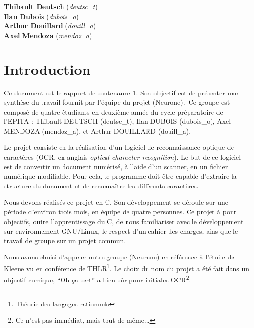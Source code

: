 \documentclass[11pt]{report}
\begin{document}
\begin{titlepage}

\Large
\textbf{Thibault Deutsch} (\emph{deutsc\_t}) \\
\textbf{Ilan Dubois} (\emph{dubois\_o}) \\
\textbf{Arthur Douillard} (\emph{douill\_a}) \\
\textbf{Axel Mendoza} (\emph{mendoz\_a})\\[2cm]

\vfill %

\end{titlepage}

\newpage
{}
\chapter{Introduction}

Ce document est le rapport de soutenance 1. Son objectif est de présenter une synthèse du travail fournit par l’équipe du projet (Neurone)\up{*}.\ Ce groupe est composé de quatre étudiants en deuxième année du cycle préparatoire de l’EPITA : Thibault DEUTSCH (deutsc\_t), Ilan DUBOIS (dubois\_o),  Axel MENDOZA (mendoz\_a), et Arthur DOUILLARD (douill\_a).

Le projet consiste en la réalisation d’un logiciel de reconnaissance optique de caractères (OCR, en anglais \emph{optical character recognition}). Le but de ce logiciel est de convertir un document numérisé, à l'aide d'un scanner, en un fichier numérique modifiable. Pour cela, le programme doit être capable d'extraire la structure du document et de reconnaître les différents caractères.

Nous devons réalisés ce projet en C. Son développement se déroule sur une période d’environ trois mois, en équipe de quatre personnes. Ce projet à pour objectifs, outre l'apprentissage du C, de nous familiariser avec le développement sur environnement GNU/Linux, le respect d'un cahier des charges, ains que le travail de groupe sur un projet commun.

Nous avons choisi d’appeler notre groupe (Neurone)\up{*} en référence à l’étoile de Kleene vu en conférence de THLR\footnote{Théorie des langages rationnels}. Le choix du nom du projet a été fait dans un objectif comique, ``Oh ça sert'' a bien sûr pour initiales OCR\footnote{Ce n'est pas immédiat, mais tout de même...}.
\end{document}
